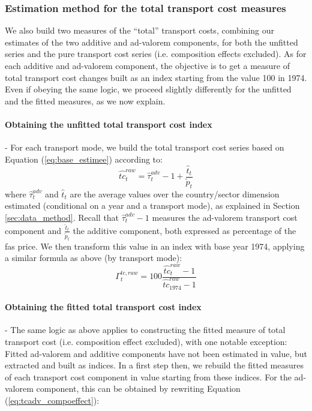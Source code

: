 \documentclass[a4paper,11pt]{article}
\begin{document}
\subsubsection{Estimation method for the total transport cost measures}

We also build two measures of the ``total'' transport costs, combining our estimates of the two additive and ad-valorem components, for both the unfitted series and the pure transport cost series (i.e. composition effects excluded).
As for each additive and ad-valorem component, the objective is to get a measure of total transport cost changes built as an index starting from the value 100 in 1974.
Even if obeying the same logic, we proceed slightly differently for the unfitted and the fitted measures, as we now explain.
\smallskip

\paragraph{Obtaining the unfitted total transport cost index} - For each transport mode, we build the total transport cost series based on Equation (\ref{eq:base_estimee}) according to:
$$\widehat{tc}^{raw}_t= \widehat{\tau}^{adv}_t -1 + \frac{\widehat{t}_t}{\widetilde{p}_t}$$
\noindent where $\widehat{\tau}^{adv}_t$ and $\widehat{t}_t$ are the average values over the country/sector dimension estimated (conditional on a year and a transport mode), as explained in Section \ref{sec:data_method}.
Recall that $\widehat{\tau}^{adv}_t-1$ measures the ad-valorem transport cost component and $\frac{\widehat{t}_t}{\widetilde{p}_t}$ the additive component, both expressed as percentage of the fas price.
We then transform this value in an index with base year 1974, applying a similar formula as above (by transport mode):
$$\Gamma^{tc, raw}_t = 100\frac{\widehat{tc}^{raw}_t -1 }{\widehat{tc}^{raw}_{1974}-1}$$

\paragraph{Obtaining the fitted total transport cost index} - The same logic as above applies to constructing the fitted measure of total transport cost (i.e. composition effect excluded), with one notable exception: Fitted ad-valorem and additive components have not been estimated in value, but extracted and built as indices.
In a first step then, we rebuild the fitted measures of each transport cost component in value starting from these indices.
For the ad-valorem component, this can be obtained by rewriting Equation (\ref{eq:tcadv_compoeffect}):
\end{document}
